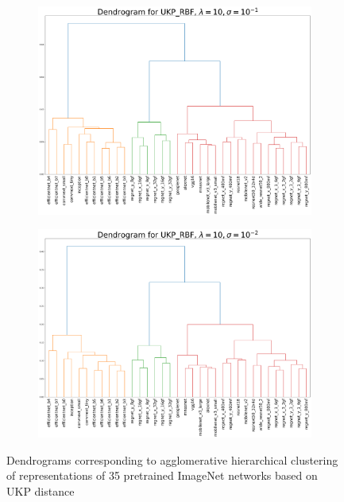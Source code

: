 \documentclass{article}
\theoremstyle{plain}
\newcommand{\metricstname}{UKP }
\begin{document}
\begin{figure}[!h]
    \vspace{0.5cm}  %
    
    \begin{subfigure}[b]{0.45\textwidth}
        \includegraphics[width=\textwidth]{Appendix figures/imagenet_experiments/Dendogram final/Dendogram for UKP_dist_RBF_1.000000e+01_1.000000e-01.png}
    \end{subfigure}
    \hfill
    \begin{subfigure}[b]{0.45\textwidth}
        \includegraphics[width=\textwidth]{Appendix figures/imagenet_experiments/Dendogram final/Dendogram for UKP_dist_RBF_1.000000e+01_1.000000e-02.png}
    \end{subfigure}
    
    \caption{Dendrograms corresponding to agglomerative hierarchical clustering of representations of 35 pretrained ImageNet networks based on \metricstname distance}
    \label{ImageNet dendrograms}
\end{figure}
\end{document}
